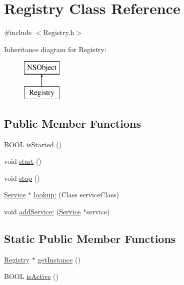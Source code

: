 \hypertarget{interface_registry}{
\section{\-Registry \-Class \-Reference}
\label{interface_registry}
}


{\ttfamily \#include $<$\-Registry.\-h$>$}

\-Inheritance diagram for \-Registry\-:\begin{figure}[H]
\begin{center}
\leavevmode
\includegraphics[height=2.000000cm]{interface_registry}
\end{center}
\end{figure}
\subsection*{\-Public \-Member \-Functions}
\begin{DoxyCompactItemize}
\item 
\-B\-O\-O\-L \hyperlink{interface_registry_a9eadfdd03b5ac06e06350a38b45666f6}{is\-Started} ()
\item 
void \hyperlink{interface_registry_add5d8bc56a289702c7199f3a7eb21046}{start} ()
\item 
void \hyperlink{interface_registry_addacc2224aa460a2572a2cd3f34b9d8e}{stop} ()
\item 
\hyperlink{interface_service}{\-Service} $\ast$ \hyperlink{interface_registry_a4d2df3454428a85aab21df6bb9dd7ca3}{lookup\-:} (\-Class service\-Class)
\item 
void \hyperlink{interface_registry_a978978b4278b57e9f53bd51305d44dce}{add\-Service\-:} (\hyperlink{interface_service}{\-Service} $\ast$service)
\end{DoxyCompactItemize}
\subsection*{\-Static \-Public \-Member \-Functions}
\begin{DoxyCompactItemize}
\item 
\hyperlink{interface_registry}{\-Registry} $\ast$ \hyperlink{interface_registry_ad01a89fc6097d3a71f5ed5fbae0e038e}{get\-Instance} ()
\item 
\-B\-O\-O\-L \hyperlink{interface_registry_a2d16855f6989111b6119c0827d0a3a4e}{is\-Active} ()
\end{DoxyCompactItemize}


